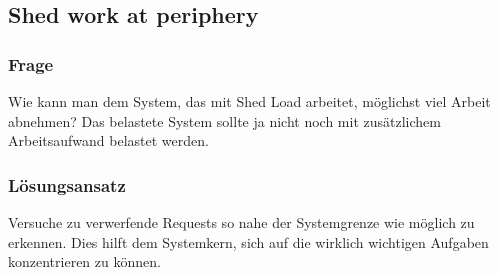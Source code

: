 \subsection{Shed work at periphery}

\subsubsection*{Frage}


Wie kann man dem System, das mit Shed Load arbeitet, möglichst viel Arbeit abnehmen? Das belastete System sollte ja nicht noch mit zusätzlichem Arbeitsaufwand belastet werden.

\subsubsection*{Lösungsansatz}


Versuche zu verwerfende Requests so nahe der Systemgrenze wie möglich zu erkennen. Dies hilft dem Systemkern, sich auf die wirklich wichtigen Aufgaben konzentrieren zu können.
